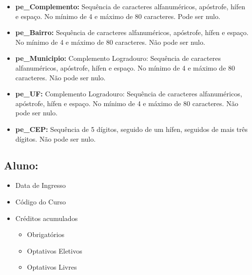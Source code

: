 \documentclass{report}
\begin{document}
\begin{itemize}
\begin{itemize}
  	\item \textbf{pe\_Complemento:} Sequência de caracteres alfanuméricos, apóstrofe, hífen e espaço. No mínimo de 4 e máximo de 80 caracteres. Pode ser nulo.
  	\item \textbf{pe\_Bairro:} Sequência de caracteres alfanuméricos, apóstrofe, hífen e espaço. No mínimo de 4 e máximo de 80 caracteres. Não pode ser nulo.
  	\item \textbf{pe\_Municipio:} Complemento Logradouro: Sequência de caracteres alfanuméricos, apóstrofe, hífen e espaço. No mínimo de 4 e máximo de 80 caracteres. Não pode ser nulo.
  	\item \textbf{pe\_UF:} Complemento Logradouro: Sequência de caracteres alfanuméricos, apóstrofe, hífen e espaço. No mínimo de 4 e máximo de 80 caracteres. Não pode ser nulo.
  	\item \textbf{pe\_CEP:} Sequência de 5 dígitos, seguido de um hífen, seguidos de mais três dígitos. Não pode ser nulo.
  	\end{itemize}
\end{itemize}
\subsection{Aluno:}
\begin{itemize}
  \item Data de Ingresso
  \item Código do Curso
  \item Créditos acumulados
  \begin{itemize}
  	\item Obrigatórios
  	\item Optativos Eletivos
  	\item Optativos Livres
  \end{itemize}
\end{itemize}
\end{document}
